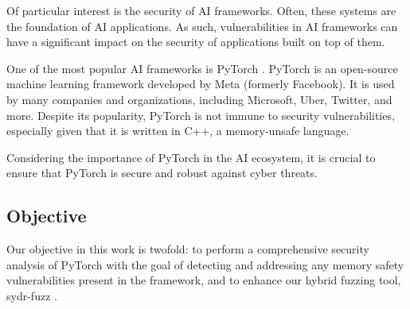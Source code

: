 Of particular interest is the security of AI frameworks. Often, these systems are the foundation of AI applications. As such, vulnerabilities in AI frameworks can have a significant impact on the security of applications built on top of them.

One of the most popular AI frameworks is PyTorch \cite{pytorch}. PyTorch is an open-source machine learning framework developed by Meta (formerly Facebook). It is used by many companies and organizations, including Microsoft, Uber, Twitter, and more. Despite its popularity, PyTorch is not immune to security vulnerabilities, especially given that it is written in C++, a memory-unsafe language.

Considering the importance of PyTorch in the AI ecosystem, it is crucial to ensure that PyTorch is secure and robust against cyber threats.

\subsection{Objective}

Our objective in this work is twofold: to perform a comprehensive security analysis of PyTorch with the goal of detecting and addressing any memory safety vulnerabilities present in the framework, and to enhance our hybrid fuzzing tool, sydr-fuzz \cite{sydr-cutting-edge-dynamic-symbolic-execution}.
